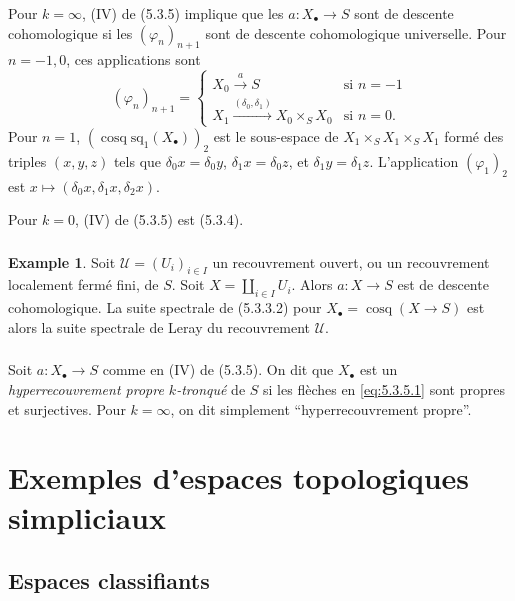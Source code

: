 \documentclass[11pt]{amsart}
\theoremstyle{plain}
\theoremstyle{definition}
\newtheorem{example}[theorem]{Example}
\DeclareMathOperator{\cosq}{cosq}
\begin{document}
\subsubsection{}
Pour $k = \infty$, (IV) de (5.3.5) implique que les $a : X_\bullet \to S$ sont de descente cohomologique si les $(\varphi_n)_{n+1}$ sont de descente cohomologique universelle. Pour $n = -1, 0$, ces applications sont
\[
(\varphi_n)_{n+1} = \begin{cases}
X_0 \xrightarrow{a} S & \text{si } n = -1 \\
X_1 \xrightarrow{(\delta_0, \delta_1)} X_0 \times_S X_0 & \text{si } n = 0.
\end{cases}
\]
Pour $n = 1$, $(\cosq \mathrm{sq}_1(X_\bullet))_2$ est le sous-espace de $X_1 \times_S X_1 \times_S X_1$ form\'e des triples $(x,y,z)$ tels que $\delta_0 x = \delta_0 y$, $\delta_1 x = \delta_0 z$, et $\delta_1 y = \delta_1 z$. L'application $(\varphi_1)_2$ est $x \mapsto (\delta_0 x, \delta_1 x, \delta_2 x)$.

Pour $k = 0$, (IV) de (5.3.5) est (5.3.4).

\subsubsection{}
\begin{example}
Soit $\mathscr{U} = (U_i)_{i \in I}$ un recouvrement ouvert, ou un recouvrement localement ferm\'e fini, de $S$. Soit $X = \coprod_{i \in I} U_i$. Alors $a : X \to S$ est de descente cohomologique. La suite spectrale de (5.3.3.2) pour $X_\bullet = \cosq(X \to S)$ est alors la suite spectrale de Leray du recouvrement $\mathscr{U}$.
\end{example}

\subsubsection{}
Soit $a : X_\bullet \to S$ comme en (IV) de (5.3.5). On dit que $X_\bullet$ est un \emph{hyperrecouvrement propre $k$-tronqu\'e} de $S$ si les fl\`eches en \eqref{eq:5.3.5.1} sont propres et surjectives. Pour $k = \infty$, on dit simplement ``hyperrecouvrement propre''.

\section{Exemples d'espaces topologiques simpliciaux}

\subsection{Espaces classifiants}
\end{document}
